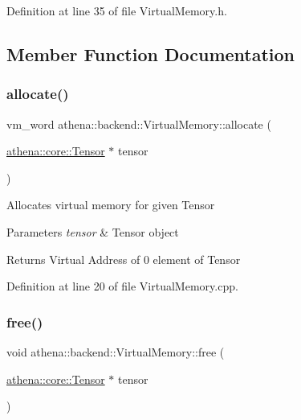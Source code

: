 Definition at line 35 of file Virtual\+Memory.\+h.



\subsection{Member Function Documentation}
\mbox{\label{classathena_1_1backend_1_1_virtual_memory_a22be58a8e0cb574a7d46d4095cb64ac5}} 
\subsubsection{\texorpdfstring{allocate()}{allocate()}}
{\footnotesize\ttfamily vm\+\_\+word athena\+::backend\+::\+Virtual\+Memory\+::allocate (\begin{DoxyParamCaption}\item[{\mbox{\hyperlink{classathena_1_1core_1_1_tensor}{athena\+::core\+::\+Tensor}} $\ast$}]{tensor }\end{DoxyParamCaption})}

Allocates virtual memory for given Tensor 
\begin{DoxyParams}{Parameters}
{\em tensor} & Tensor object \\
\hline
\end{DoxyParams}
\begin{DoxyReturn}{Returns}
Virtual Address of 0 element of Tensor 
\end{DoxyReturn}


Definition at line 20 of file Virtual\+Memory.\+cpp.

\mbox{\label{classathena_1_1backend_1_1_virtual_memory_a73815358c436f8f6dd73d49d4d5d189d}} 
\subsubsection{\texorpdfstring{free()}{free()}\hspace{0.1cm}{\footnotesize\ttfamily [1/2]}}
{\footnotesize\ttfamily void athena\+::backend\+::\+Virtual\+Memory\+::free (\begin{DoxyParamCaption}\item[{\mbox{\hyperlink{classathena_1_1core_1_1_tensor}{athena\+::core\+::\+Tensor}} $\ast$}]{tensor }\end{DoxyParamCaption})}

